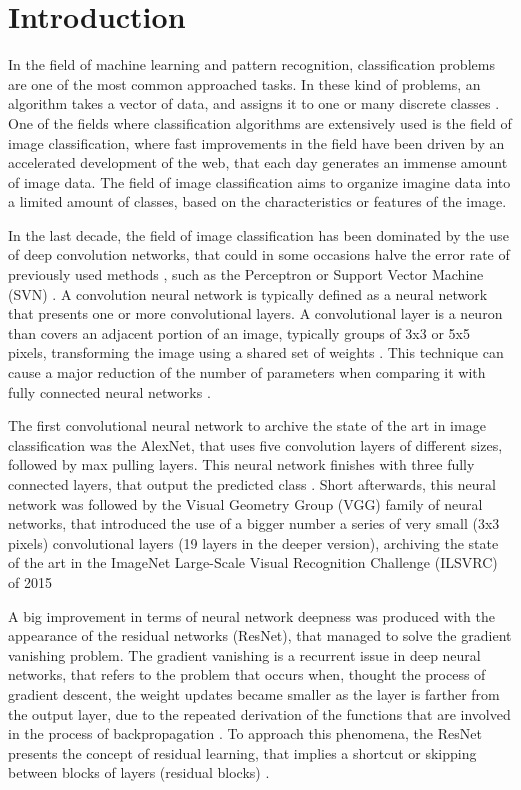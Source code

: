 \documentclass[10pt,onecolumn,titlepage,letterpaper]{article}
\begin{document}
\section{Introduction}

In the field of machine learning  and pattern recognition, classification problems are one of the most common approached tasks. In these kind of problems, an algorithm takes a vector of data, and assigns it to one or many discrete classes \cite{Bishop2006}. One of the fields where classification algorithms are extensively used is the field of image classification, where fast improvements in the field have been driven by an accelerated development of the web, that each day generates an immense amount of image data. The field of image classification aims to organize imagine data into a limited amount of classes, based on the characteristics or features of the image. \cite{Zhang2019}

In the last decade, the field of image classification has been dominated by the use of deep convolution networks, that could in some occasions halve the error rate of previously used methods \cite{Krizhevsky2017}, such as the Perceptron \cite{Rosenblatt1957} or Support Vector Machine (SVN) \cite{Vapnik1995}. A convolution neural network is typically defined as a neural network that presents one or more convolutional layers. A convolutional layer is a neuron than covers an adjacent portion of an image, typically groups of 3x3 or 5x5 pixels, transforming the image using a shared set of weights . This technique can cause a major reduction of the number of parameters when comparing it with fully connected neural networks \cite{Aghdam2017}.

The first convolutional neural network to archive the state of the art in image classification was the AlexNet, that uses five convolution layers of different sizes, followed by max pulling layers. This neural network finishes with three fully connected layers, that output the predicted class \cite{Krizhevsky2012}. Short afterwards, this neural network was followed by the Visual Geometry Group (VGG) family of neural networks, that introduced the use of a bigger number a series of very small (3x3 pixels) convolutional layers (19 layers in the deeper version), archiving the state of the art in the ImageNet Large-Scale Visual Recognition Challenge (ILSVRC) of 2015 \cite{Simonyan2015}

A big improvement in terms of neural network deepness was produced with the appearance of the residual networks (ResNet), that managed to solve the gradient vanishing problem. The gradient vanishing is a recurrent issue in deep neural networks, that refers to the problem that occurs when, thought the process of gradient descent, the weight updates became smaller as the layer is farther from the output layer, due to the repeated derivation of the functions that are involved in the process of backpropagation \cite{Aghdam2017,Skansi2018}. To approach this phenomena, the ResNet presents the concept of residual learning, that implies a shortcut or skipping between blocks of layers (residual blocks) \cite{He2016,He2016a}.
\end{document}
